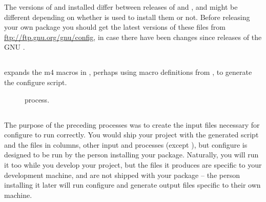 The versions of  and  installed differ
between releases of  and , and might be different
depending on whether  is used to install them or not. Before
releasing your own package you should get the latest versions of these
files from \url{ftp://ftp.gnu.org/gnu/config}, in case there have been
changes since releases of the GNU .

\subsection{}
 expands the m4 macros in , perhaps using macro definitions from , to generate the configure script.

\begin{figure}[h!]
\centering
{}
\caption{ process.}
\label{fig:aclocal}
\end{figure}

\subsection{}
The purpose of the preceding processes was to create the input files
necessary for configure to run correctly. You would ship your project
with the generated script and the files in columns, other input and
processes (except ), but configure is designed to be run
by the person installing your package. Naturally, you will run it too
while you develop your project, but the files it produces are specific
to your development machine, and are not shipped with your package --
the person installing it later will run configure and generate output
files specific to their own machine.

